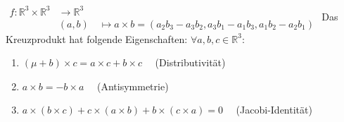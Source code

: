 \documentclass[10pt,landscape]{article}
\begin{document}
\begin{multicols}{3}
$\begin{aligned}
    f: \mathbb{R}^{3} \times \mathbb{R}^{3} & \longrightarrow \mathbb{R}^{3} \\
    &(a, b) \quad \longmapsto a \times b=\left(a_{2} b_{3}-a_{3} b_{2}, a_{3} b_{1}-a_{1} b_{3}, a_{1} b_{2}-a_{2} b_{1}\right)
\end{aligned}$
Das Kreuzprodukt hat folgende Eigenschaften: $\forall a, b, c \in \mathbb{R}^{3}:$
\begin{enumerate}
    \item $(\mu+b) \times c=a \times c+b \times c \quad$ (Distributivität)
    \item $a \times b=-b \times a \quad$ (Antisymmetrie)
    \item $a \times(b \times c)+c \times(a \times b)+b \times(c \times a)=0 \quad$ (Jacobi-Identität)
\end{enumerate}

\end{multicols}
\end{document}
